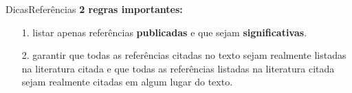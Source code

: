 \documentclass[t]{beamer}
\begin{document}

\begin{ftst}{Dicas}{Referências}
\justifying
\textbf{2 regras importantes:}
\vone
\begin{itemize}
    \item[1.] listar apenas referências \textbf{publicadas} e que sejam \textbf{significativas}. 
    \item[2.] garantir que todas as referências citadas no texto sejam realmente listadas na literatura citada e que todas as referências listadas na literatura citada sejam realmente citadas em algum lugar do texto.
\end{itemize}

\end{ftst}
\end{document}
